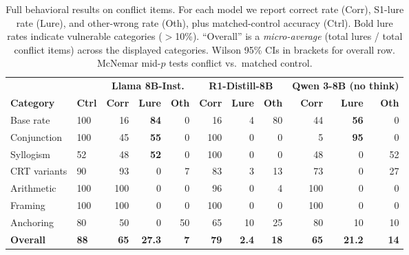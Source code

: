 \documentclass{article}
\begin{document}
\begin{table}[t]
\centering
\caption{Full behavioral results on conflict items.  For each model
  we report correct rate (Corr), S1-lure rate (Lure), and other-wrong
  rate (Oth), plus matched-control accuracy (Ctrl).  Bold lure rates
  indicate vulnerable categories ($>$10\%).  ``Overall'' is a
  \emph{micro-average} (total lures / total conflict items) across the displayed categories.
  Wilson 95\% CIs in brackets for overall row.  McNemar mid-$p$ tests
  conflict vs.\ matched control.}
\label{tab:behavioral}
\vspace{4pt}
\scriptsize
\setlength{\tabcolsep}{2.5pt}
\begin{tabular}{ll rrr rrr rrr}
\toprule
& & \multicolumn{3}{c}{\textbf{Llama 8B-Inst.}} & \multicolumn{3}{c}{\textbf{R1-Distill-8B}} & \multicolumn{3}{c}{\textbf{Qwen 3-8B (no think)}} \\
\cmidrule(lr){3-5}\cmidrule(lr){6-8}\cmidrule(lr){9-11}
\textbf{Category} & \textbf{Ctrl} & \textbf{Corr} & \textbf{Lure} & \textbf{Oth} & \textbf{Corr} & \textbf{Lure} & \textbf{Oth} & \textbf{Corr} & \textbf{Lure} & \textbf{Oth} \\
\midrule
Base rate      & 100  & 16  & \textbf{84} & 0   & 16  & 4   & 80 & 44  & \textbf{56} & 0 \\
Conjunction    & 100  & 45  & \textbf{55} & 0   & 100 & 0   & 0  & 5   & \textbf{95} & 0 \\
Syllogism      & 52   & 48  & \textbf{52} & 0   & 100 & 0   & 0  & 48  & 0   & 52 \\
\addlinespace
CRT variants   & 90   & 93  & 0   & 7   & 83  & 3   & 13 & 73  & 0   & 27 \\
Arithmetic     & 100  & 100 & 0   & 0   & 96  & 0   & 4  & 100 & 0   & 0 \\
Framing        & 100  & 100 & 0   & 0   & 100 & 0   & 0  & 100 & 0   & 0 \\
Anchoring      & 80   & 50  & 0   & 50  & 65  & 10  & 25 & 80  & 10  & 10 \\
\midrule
\textbf{Overall} & \textbf{88} & \textbf{65} & \textbf{27.3} & \textbf{7}
  & \textbf{79} & \textbf{2.4} & \textbf{18}
  & \textbf{65} & \textbf{21.2} & \textbf{14} \\
\bottomrule
\end{tabular}


\end{table}
\end{document}
